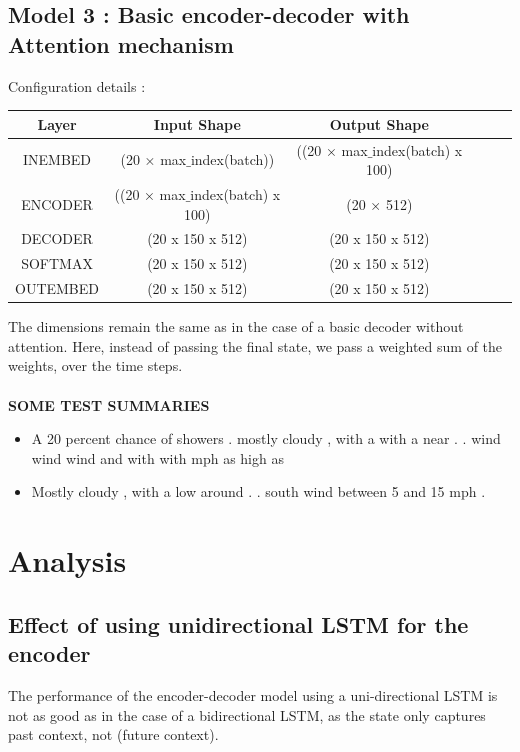 \documentclass[12pt]{report}
\begin{document}
\subsection{Model 3 : Basic encoder-decoder with Attention mechanism}
Configuration details :
\begin{table}[H]
	\label{T:equipos}
	\begin{center}
		\begin{tabular}{| c | c | c | c | c | c |}
			\hline
			\textbf{Layer} & \textbf{Input Shape} & \textbf{Output Shape}\\ 
			\hline
			INEMBED & (20 × max$\_$index(batch))& ((20 × max$\_$index(batch) x 100) \\
            ENCODER & ((20 × max$\_$index(batch) x 100) & (20 × 512) \\
            DECODER & (20 x 150 x 512) & (20 x 150 x 512) \\
            SOFTMAX  & (20 x 150 x 512) & (20 x 150 x 512) \\
            OUTEMBED  & (20 x 150 x 512) & (20 x 150 x 512) \\
            \hline
		\end{tabular}
	\end{center}
\end{table}
The dimensions remain the same as in the case of a basic decoder without attention.
Here, instead of passing the final state, we pass a weighted sum of the weights, over the time steps.\\\\
\textbf{SOME TEST SUMMARIES}
\begin{itemize}
\item A 20 percent chance of showers . mostly cloudy , with a with a near . . wind wind wind and with with mph as high as
\item Mostly cloudy , with a low around . . south wind between 5 and 15 mph . 
\end{itemize}

\section{Analysis}

\subsection{Effect of using unidirectional LSTM for the encoder}
The performance of the encoder-decoder model using a uni-directional LSTM is not as good as in the case of a bidirectional LSTM, as the state only captures past context, not (future context).
\end{document}

